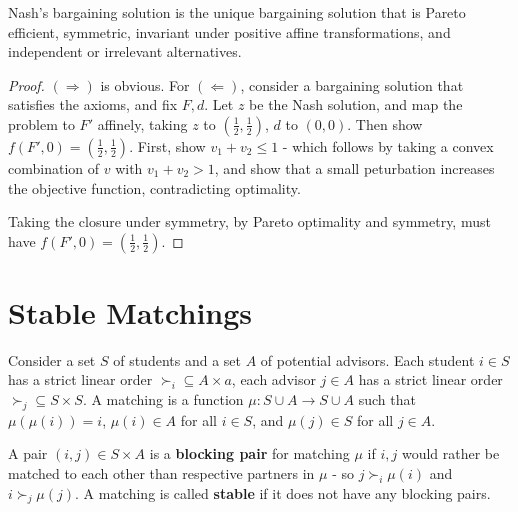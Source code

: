 \begin{thm}
  \label{sec:bargaining-4}
  Nash's bargaining solution is the unique bargaining solution that is
  Pareto efficient, symmetric, invariant under positive affine
  transformations, and independent or irrelevant alternatives.
\end{thm}

\begin{proof}
  $(\Rightarrow)$ is obvious. For $(\Leftarrow)$, consider a
  bargaining solution that satisfies the axioms, and fix $F, d$. Let
  $z$ be the Nash solution, and map the problem to $F'$ affinely,
  taking $z$ to $(\frac{1}{2}, \frac{1}{2})$, $d$ to $(0, 0)$. Then
  show $f(F', 0) = (\frac{1}{2}, \frac{1}{2})$. First, show $v_{1} +
  v_{2} \leq 1$ - which follows by taking a convex combination of $v$
  with $v_{1} + v_{2} > 1$, and show that a small peturbation
  increases the objective function, contradicting optimality.

  Taking the closure under symmetry, by Pareto optimality and
  symmetry, must have $f(F', 0) = (\frac{1}{2}, \frac{1}{2})$.
\end{proof}

\section{Stable Matchings}
\label{sec:stable-matchings}

\begin{defn}
  \label{sec:stable-matchings-1}
  Consider a set $S$ of students and a set $A$ of potential advisors.
  Each student $i \in S$ has a strict linear order $\succ_{i}
  \subseteq A \times a$, each advisor $j \in A$ has a strict linear
  order $\succ_{j} \subseteq S \times S$.  A matching is a function
  $\mu: S \cup A \rightarrow S \cup A$ such that $\mu(\mu(i)) = i$,
  $\mu(i) \in A$ for all $i \in S$, and $\mu(j) \in S$ for all $j \in
  A$.

  A pair $(i, j) \in S \times A$  is a \textbf{blocking pair} for
  matching $\mu$ if $i, j$ would rather be matched to each other than
  respective partners in $\mu$ - so $j \succ_{i} \mu(i)$ and $i
  \succ_{j} \mu(j)$.  A matching is called \textbf{stable} if it
  does not have any blocking pairs.
\end{defn}

